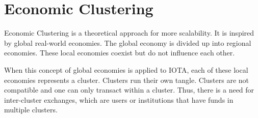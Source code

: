 \section{Economic Clustering}

Economic Clustering is a theoretical approach for more scalability. It is inspired by global real-world economies. The global economy is divided up into regional economies. These local economies coexist but do not influence each other. 

When this concept of global economies is applied to IOTA, each of these local economies represents a cluster. Clusters run their own tangle. Clusters are not compatible and one can only transact within a cluster. Thus, there is a need for inter-cluster exchanges, which are users or institutions that have funds in multiple clusters. 

